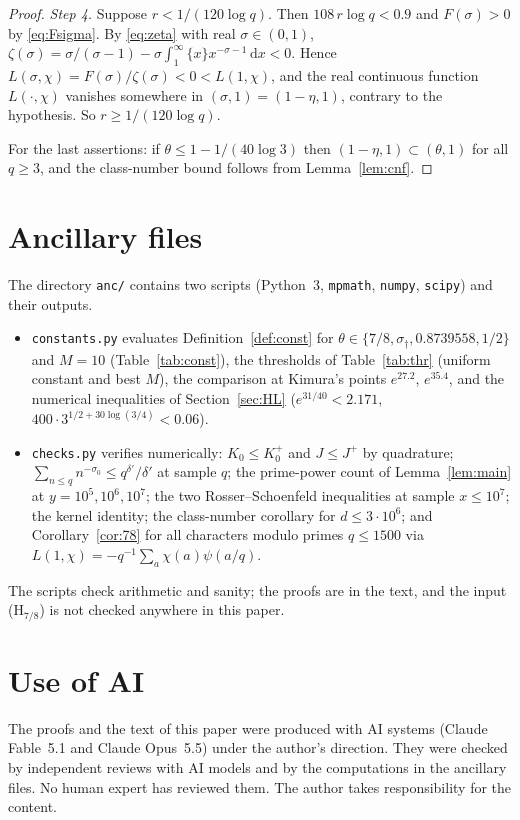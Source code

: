 \documentclass[11pt]{article}
\theoremstyle{definition}
\theoremstyle{remark}
\numberwithin{equation}{section}
\newcommand{\dd}{\,\mathrm{d}}
\begin{document}
\begin{proof}
\emph{Step 4.} Suppose $r<1/(120\log q)$. Then $108\,r\log q<0.9$ and $F(\sigma)>0$ by \eqref{eq:Fsigma}. By \eqref{eq:zeta} with real $\sigma\in(0,1)$, $\zeta(\sigma)=\sigma/(\sigma-1)-\sigma\int_1^\infty\{x\}x^{-\sigma-1}\dd x<0$. Hence $L(\sigma,\chi)=F(\sigma)/\zeta(\sigma)<0<L(1,\chi)$, and the real continuous function $L(\cdot,\chi)$ vanishes somewhere in $(\sigma,1)=(1-\eta,1)$, contrary to the hypothesis. So $r\ge1/(120\log q)$.

For the last assertions: if $\theta\le1-1/(40\log3)$ then $(1-\eta,1)\subset(\theta,1)$ for all $q\ge3$, and the class-number bound follows from Lemma~\ref{lem:cnf}.
\end{proof}

\section{Ancillary files}\label{sec:anc}
The directory \texttt{anc/} contains two scripts (Python~3, \texttt{mpmath}, \texttt{numpy}, \texttt{scipy}) and their outputs.
\begin{itemize}
\item \texttt{constants.py} evaluates Definition~\ref{def:const} for $\theta\in\{7/8,\sigma_\dagger,0.8739558,1/2\}$ and $M=10$ (Table~\ref{tab:const}), the thresholds of Table~\ref{tab:thr} (uniform constant and best $M$), the comparison at Kimura's points $e^{27.2}$, $e^{35.4}$, and the numerical inequalities of Section~\ref{sec:HL} ($e^{31/40}<2.171$, $400\cdot3^{1/2+30\log(3/4)}<0.06$).
\item \texttt{checks.py} verifies numerically: $K_0\le K_0^+$ and $J\le J^+$ by quadrature; $\sum_{n\le q}n^{-\sigma_0}\le q^{\delta'}/\delta'$ at sample $q$; the prime-power count of Lemma~\ref{lem:main} at $y=10^5,10^6,10^7$; the two Rosser--Schoenfeld inequalities at sample $x\le10^7$; the kernel identity; the class-number corollary for $d\le3\cdot10^6$; and Corollary~\ref{cor:78} for all characters modulo primes $q\le1500$ via $L(1,\chi)=-q^{-1}\sum_{a}\chi(a)\psi(a/q)$.
\end{itemize}
The scripts check arithmetic and sanity; the proofs are in the text, and the input (H$_{7/8}$) is not checked anywhere in this paper.

\begingroup\raggedright


\endgroup
\section*{Use of AI}
The proofs and the text of this paper were produced with AI systems (Claude Fable~5.1 and Claude Opus~5.5) under the author's direction. They were checked by independent reviews with AI models and by the computations in the ancillary files. No human expert has reviewed them. The author takes responsibility for the content.
\end{document}
